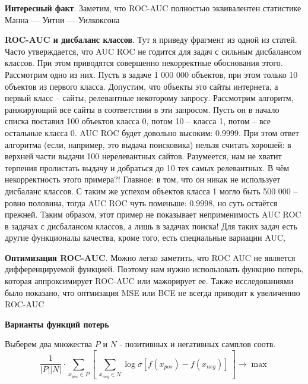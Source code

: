 \documentclass{article}
\begin{document}
    \quad

    \textbf{Интересный факт}. 
    Заметим, что ROC-AUC полностью эквивалентен статистике Манна — Уитни — Уилкоксона 

    \quad 

    \textbf{ROC-AUC и дисбаланс классов}. Тут я приведу фрагмент из одной из статей. 
    Часто утверждается, что AUC ROC не годится для задач с сильным дисбалансом классов. 
    При этом приводятся совершенно некорректные обоснования этого. 
    Рассмотрим одно из них. 
    Пусть в задаче 1 000 000 объектов, при этом только 10 объектов из первого класса. 
    Допустим, что объекты это сайты интернета, а первый класс – сайты, 
    релевантные некоторому запросу. 
    Рассмотрим алгоритм, ранжирующий все сайты в соответствии в эти запросом. 
    Пусть он в начало списка поставил 100 объектов класса 0, 
    потом 10 – класса 1, потом – все остальные класса 0. 
    AUC ROC будет довольно высоким: 0.9999. 
    При этом ответ алгоритма (если, например, это выдача поисковика) 
    нельзя считать хорошей: в верхней части выдачи 100 нерелевантных сайтов. 
    Разумеется, нам не хватит терпения пролистать выдачу и добраться до 10 тех самых релевантных.
    В чём некорректность этого примера?! 
    Главное: в том, что он никак не использует дисбаланс классов. 
    С таким же успехом объектов класса 1 могло быть 500 000 – ровно половина, 
    тогда AUC ROC чуть поменьше: 0.9998, но суть остаётся прежней. 
    Таким образом, этот пример не показывает неприменимость 
    AUC ROC в задачах с дисбалансом классов, а лишь в задачах поиска! 
    Для таких задач есть другие функционалы качества, кроме того, есть специальные вариации AUC,

    \textbf{Оптимизация ROC-AUC}. Можно легко заметить, что ROC AUC не является дифференцируемой функцией. Поэтому нам нужно 
    использовать функцию потерь, которая аппроксимирует ROC-AUC или мажорирует ее. Также исследованиями было показано, что 
    оптмизация MSE или BCE не всегда приводит к увеличению ROC-AUC

    \quad 

    \textbf{Варианты функций потерь}

    \quad 

    Выберем два множества $P$ и $N$ - позитивных и негативных самплов соотв. 
    \begin{equation}
        \frac{1}{|P| |N|}  \cdot \sum_{x_{pos} \in P} [ \ \sum_{x_{neg} \in N} \log\sigma[f(x_{pos}) - f(x_{neg})] \ ] \rightarrow \max
    \end{equation}
\end{document}
